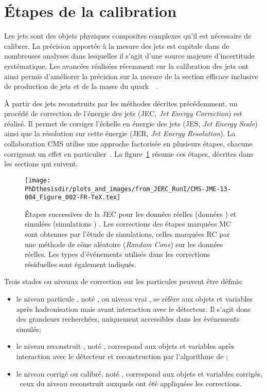 \section{Étapes de la calibration}\label{chapter-JERC-section-CMS}
Les jets sont des objets physiques composites complexes qu'il est nécessaire de calibrer.
La précision apportée à la mesure des jets est capitale dans de nombreuses analyses dans lesquelles il s'agit d'une source majeure d'incertitude systématique.
Les avancées réalisées récemment sur la calibration des jets ont ainsi permis d'améliorer la précision sur la mesure de la section efficace inclusive de production de jets et de la masse du quark~\quarkt~\cite{JERC_RunI}.
\par À partir des jets reconstruits par les méthodes décrites précédemment, un procédé de correction de l'énergie des jets (JEC, \emph{Jet Energy Correction}) est réalisé.
Il permet de corriger l'échelle en énergie des jets (JES, \emph{Jet Energy Scale}) ainsi que la résolution sur cette énergie (JER, \emph{Jet Energy Resolution}).
La collaboration CMS utilise une approche factorisée en plusieurs étapes, chacune corrigeant un effet en particulier~\cite{JERC_RunI}.
La figure~\ref{fig-CMS-JME-13-004_Figure_002-TeX} résume ces étapes, décrites dans les sections qui suivent.
\begin{figure}[h]
\centering
\texttt{[image: \\PhDthesisdir/plots\_and\_images/from\_JERC\_RunI/CMS-JME-13-004\_Figure\_002-FR-TeX.tex]}
\caption[Étapes successives de la JEC.]{Étapes successives de la JEC pour les données réelles (\og données \fg) et simulées (\og simulations \fg) \cite{JERC_RunI}. Les corrections des étapes marquées \og MC \fg{} sont obtenues par l'étude de simulations, celles marquées \og RC \fg{} par une méthode de cône aléatoire (\emph{Random Cone}) sur les données réelles. Les types d'événements utilisés dans les corrections résiduelles sont également indiqués.}
\label{fig-CMS-JME-13-004_Figure_002-TeX}
\end{figure}
\par Trois stades ou \og niveaux \fg{} de correction sur les particules peuvent être définis:
\begin{itemize}
\item le niveau \og particule \fg, noté \ptcl, ou niveau \og vrai \fg{}, se réfère aux objets et variables après hadronisation mais avant interaction avec le détecteur. Il s'agit donc des grandeurs recherchées, uniquement accessibles dans les événements simulés;
\item le niveau \og reconstruit \fg, noté \reco, correspond aux objets et variables après interaction avec le détecteur et reconstruction par l'algorithme de \PF;
\item le niveau \og corrigé \fg{} ou calibré, noté \cali, correspond aux objets et variables corrigés, \ie\ ceux du niveau reconstruit auxquels ont été appliquées les corrections.
\end{itemize}
